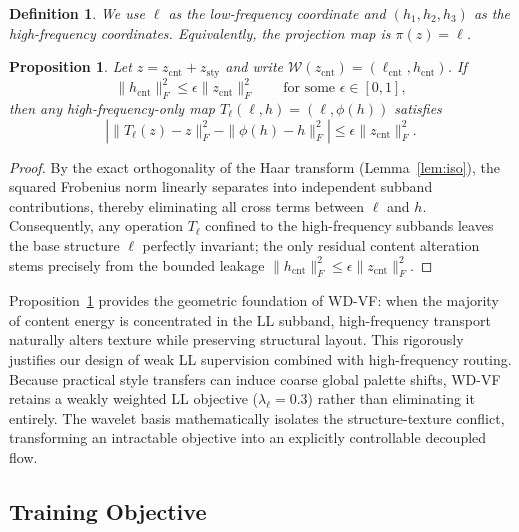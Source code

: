 \documentclass[letterpaper]{article}
\newtheorem{definition}{Definition}
\newtheorem{proposition}{Proposition}
\begin{document}
\begin{definition}
\label{def:fiber}
We use $\ell$ as the low-frequency coordinate and $(h_1,h_2,h_3)$ as the high-frequency coordinates.
Equivalently, the projection map is $\pi(z)=\ell$.
\end{definition}

\begin{proposition}
\label{prop:decouple}
Let $z=z_{\mathrm{cnt}}+z_{\mathrm{sty}}$ and write $\mathcal W(z_{\mathrm{cnt}})=(\ell_{\mathrm{cnt}},h_{\mathrm{cnt}})$. If
\begin{equation}
\|h_{\mathrm{cnt}}\|_F^2 \le \epsilon \|z_{\mathrm{cnt}}\|_F^2
\qquad
\text{for some } \epsilon\in[0,1],
\end{equation}
then any high-frequency-only map $T_\ell(\ell,h)=(\ell,\phi(h))$ satisfies
\begin{equation}
\left|
\|T_\ell(z)-z\|_F^2 - \|\phi(h)-h\|_F^2
\right|
\le \epsilon \|z_{\mathrm{cnt}}\|_F^2.
\end{equation}
\end{proposition}
\begin{proof}
By the exact orthogonality of the Haar transform (Lemma~\ref{lem:iso}), the squared Frobenius norm linearly separates into independent subband contributions, thereby eliminating all cross terms between $\ell$ and $h$. Consequently, any operation $T_\ell$ confined to the high-frequency subbands leaves the base structure $\ell$ perfectly invariant; the only residual content alteration stems precisely from the bounded leakage $\|h_{\mathrm{cnt}}\|_F^2 \le \epsilon \|z_{\mathrm{cnt}}\|_F^2$.
\end{proof}

Proposition~\ref{prop:decouple} provides the geometric foundation of WD-VF: when the majority of content energy is concentrated in the LL subband, high-frequency transport naturally alters texture while preserving structural layout. 
This rigorously justifies our design of weak LL supervision combined with high-frequency routing.
Because practical style transfers can induce coarse global palette shifts, WD-VF retains a weakly weighted LL objective ($\lambda_\ell = 0.3$) rather than eliminating it entirely. 
The wavelet basis mathematically isolates the structure-texture conflict, transforming an intractable objective into an explicitly controllable decoupled flow.

\subsection{Training Objective}
\label{sec:baselock}
\end{document}
